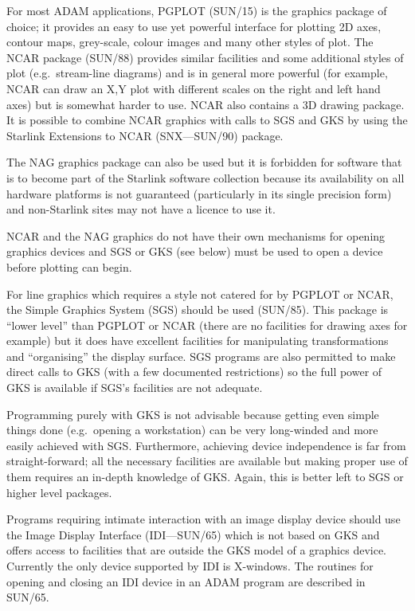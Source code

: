 \documentclass[twoside,11pt]{article}
\newcommand{\xref}[3]{#1}
\renewcommand{\_}{\texttt{\symbol{95}}}
\begin{document}
For most ADAM applications, 
\xref{PGPLOT}{sun15}{} (SUN/15) is the graphics package of choice;
it provides an easy to use yet powerful interface for plotting 2D axes, contour 
maps, grey-scale, colour images and many other styles of plot. The 
\xref{NCAR package}{sun88}{}
(SUN/88) provides similar facilities and some additional styles of plot
(e.g.\ stream-line diagrams) and is in general more powerful (for example, NCAR
can draw an X,Y plot with different scales on the right and left hand axes) but
is somewhat harder to use. NCAR also contains a 3D drawing package. It
is possible to combine NCAR graphics with calls to SGS and GKS by using
the \xref{Starlink Extensions to NCAR}{sun90}{} (SNX---SUN/90) package.

The NAG graphics package can also be used but it is forbidden for 
software that is to become part of the Starlink software collection because 
its availability on all hardware platforms is not guaranteed
(particularly in its single precision form) and non-Starlink sites may
not have a licence to use it.

NCAR and the NAG graphics do not have their own mechanisms for opening graphics
devices and SGS or GKS (see below) must be used to open a device before
plotting can begin.

For line graphics which requires a style not catered for by PGPLOT or NCAR, the
\xref{Simple Graphics System}{sun85}{}
(SGS) should be used (SUN/85). This package is ``lower
level'' than PGPLOT or NCAR (there are no facilities for drawing axes for
example) but it does have excellent facilities for manipulating transformations
and ``organising'' the display surface. SGS programs are also permitted to make
direct calls to GKS (with a few documented restrictions) so the full power of
GKS is available if SGS's facilities are not adequate.

Programming purely with GKS is not advisable because getting even simple things
done (e.g.\ opening a workstation) can be very long-winded and more easily
achieved with SGS. Furthermore, achieving device independence is far from
straight-forward; all the necessary facilities are available but making proper
use of them requires an in-depth knowledge of GKS. Again, this is better left
to SGS or higher level packages.

Programs requiring intimate interaction with an image display device should use
the \xref{Image Display Interface}{sun65}{}
(IDI---SUN/65) which is not based on GKS and offers
access to facilities that are outside the GKS model of a graphics device.
Currently the only device supported by IDI is 
X-windows. The routines for opening and closing an IDI device in an
ADAM program are described in SUN/65.
\end{document}
